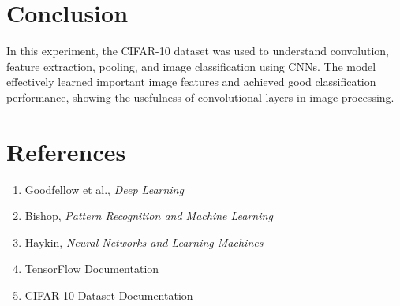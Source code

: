 \documentclass[12pt,a4paper]{article}
\begin{document}
\section{Conclusion}

In this experiment, the CIFAR-10 dataset was used to understand convolution, feature extraction, pooling, and image classification using CNNs. The model effectively learned important image features and achieved good classification performance, showing the usefulness of convolutional layers in image processing.
\section{References}

\begin{enumerate}
    \item Goodfellow et al., \textit{Deep Learning}
    \item Bishop, \textit{Pattern Recognition and Machine Learning}
    \item Haykin, \textit{Neural Networks and Learning Machines}
    \item TensorFlow Documentation
    \item CIFAR-10 Dataset Documentation
\end{enumerate}
\end{document}
